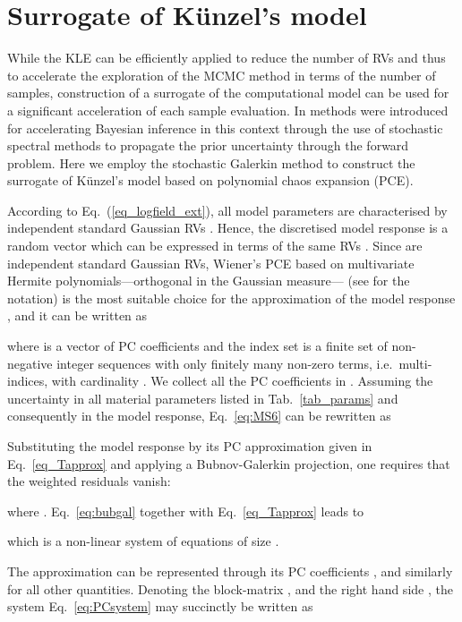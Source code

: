 \documentclass[preprint,12pt]{elsarticle}
\begin{document}
\section{Surrogate of K\"unzel's model}
\label{sec:pce}
While the KLE can be efficiently applied to reduce the number of RVs and
thus to accelerate the exploration of the MCMC method in terms of the
number of samples, construction of a surrogate of the computational
model can be used for a significant acceleration of each sample
evaluation. In \cite{Marzouk:2007:JCP, Marzouk:2009:JCP}
methods  were introduced for accelerating Bayesian inference in this
context through the use of stochastic spectral methods to propagate
the prior
uncertainty through the forward problem. Here we employ the
stochastic Galerkin method
\cite{Babuska:2004:SIAM, Matthies:2005:CMAME} to construct the
surrogate of K\"unzel's model based on polynomial chaos expansion
(PCE).

According to Eq.~(\ref{eq_logfield_ext}), all model parameters are
characterised by  independent standard Gaussian RVs
. Hence,
the discretised model response  is a random
vector which can be expressed in terms of the same RVs
.  Since  are independent
standard Gaussian RVs, Wiener's PCE based on multivariate Hermite
polynomials---orthogonal in the Gaussian
measure--- (see
\cite{Matthies:2005:CMAME, Matthies:2007:IB} for the notation) is the
most suitable choice for the approximation
 of the model response
 \cite{Xiu:2002:SIAM}, and it can be
written as

where  is a vector of PC coefficients and the index set  is a finite set of non-negative integer
sequences with only finitely many non-zero terms, i.e.\ multi-indices,
with cardinality .
We collect all the PC coefficients in .
Assuming the uncertainty in all material parameters listed in
Tab.~\ref{tab_params} and consequently in the model response,
Eq.~\eqref{eq:MS6} can be rewritten as

Substituting the model response  by its PC
approximation  given in
Eq.~\eqref{eq_Tapprox} and applying a Bubnov-Galerkin projection, one
requires that the weighted residuals vanish:

where .
Eq.~\eqref{eq:bubgal} together with Eq.~\eqref{eq_Tapprox} leads to

which is a non-linear system of equations of size .

The approximation  can be
represented through its PC coefficients , and similarly
for all other quantities. Denoting the block-matrix
,
and the right hand side , the system
Eq.~\eqref{eq:PCsystem} may succinctly be written as
\end{document}
